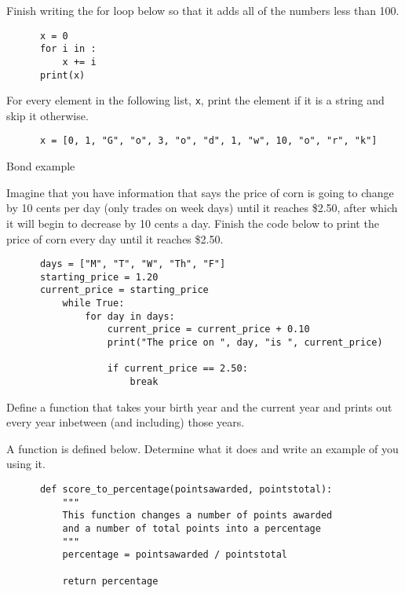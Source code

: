 \documentclass[11pt]{article}
\begin{document}
\begin{questions}
  \item Finish writing the for loop below so that it adds all of the numbers less than 100.
    \begin{verbatim}
      x = 0
      for i in :
          x += i
      print(x)
    \end{verbatim}

  \item For every element in the following list, \texttt{x}, print the element if it is a string and skip it otherwise.
    \begin{verbatim}
      x = [0, 1, "G", "o", 3, "o", "d", 1, "w", 10, "o", "r", "k"]
    \end{verbatim}

  \item Bond example

  \item Imagine that you have information that says the price of corn is going to change by 10 cents per day (only trades on week days) until it reaches \$2.50, after which it will begin to decrease by 10 cents a day. Finish the code below to print the price of corn every day until it reaches \$2.50.
    \begin{verbatim}
      days = ["M", "T", "W", "Th", "F"]
      starting_price = 1.20
      current_price = starting_price
          while True:
              for day in days:
                  current_price = current_price + 0.10
                  print("The price on ", day, "is ", current_price)

                  if current_price == 2.50:
                      break
    \end{verbatim}

  \item Define a function that takes your birth year and the current year and prints out every year inbetween (and including) those years.

  \item A function is defined below. Determine what it does and write an example of you using it.
    \begin{verbatim}
      def score_to_percentage(pointsawarded, pointstotal):
          """
          This function changes a number of points awarded
          and a number of total points into a percentage
          """
          percentage = pointsawarded / pointstotal

          return percentage
    \end{verbatim}


\end{questions}
\end{document}
